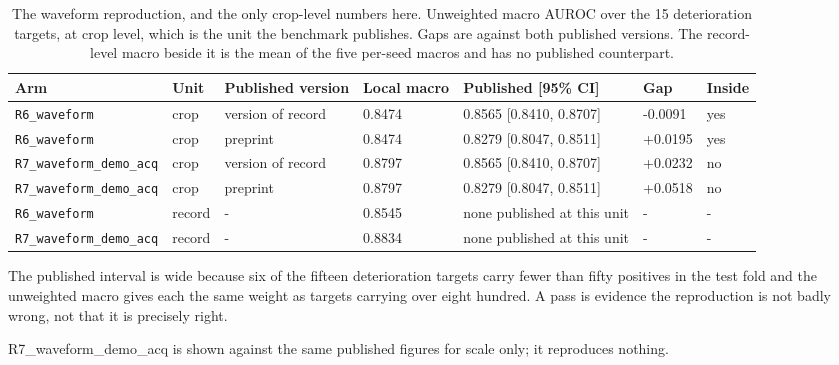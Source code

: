 \begin{table}[t]
\centering
\small
\caption{The waveform reproduction, and the only crop-level numbers here. Unweighted macro AUROC over the 15 deterioration targets, at crop level, which is the unit the benchmark publishes. Gaps are against both published versions. The record-level macro beside it is the mean of the five per-seed macros and has no published counterpart.}
\label{tab:reproduction}
\begin{tabular}{lllllll}
\toprule
Arm & Unit & Published version & Local macro & Published [95\% CI] & Gap & Inside \\
\midrule
\texttt{R6\_waveform} & crop & version of record & 0.8474 & 0.8565 [0.8410, 0.8707] & -0.0091 & yes \\
\texttt{R6\_waveform} & crop & preprint & 0.8474 & 0.8279 [0.8047, 0.8511] & +0.0195 & yes \\
\texttt{R7\_waveform\_demo\_acq} & crop & version of record & 0.8797 & 0.8565 [0.8410, 0.8707] & +0.0232 & no \\
\texttt{R7\_waveform\_demo\_acq} & crop & preprint & 0.8797 & 0.8279 [0.8047, 0.8511] & +0.0518 & no \\
\texttt{R6\_waveform} & record & - & 0.8545 & none published at this unit & - & - \\
\texttt{R7\_waveform\_demo\_acq} & record & - & 0.8834 & none published at this unit & - & - \\
\bottomrule
\end{tabular}
\par\footnotesize The published interval is wide because six of the fifteen deterioration targets carry fewer than fifty positives in the test fold and the unweighted macro gives each the same weight as targets carrying over eight hundred. A pass is evidence the reproduction is not badly wrong, not that it is precisely right.
\par\footnotesize R7\_waveform\_demo\_acq is shown against the same published figures for scale only; it reproduces nothing.
\end{table}

